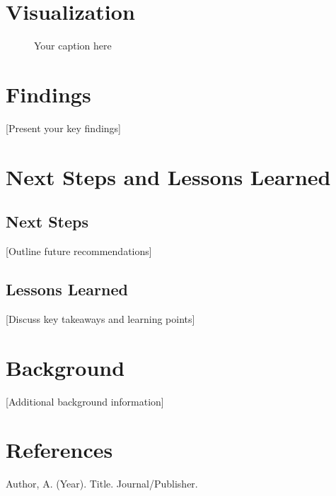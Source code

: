 \documentclass[12pt,a4paper]{article}
\begin{document}
\section{Visualization}
\begin{figure}[H]
    \centering
    \caption{Your caption here}
    \label{fig:your-label}
\end{figure}

\section{Findings}
[Present your key findings]

\section{Next Steps and Lessons Learned}
\subsection{Next Steps}
[Outline future recommendations]

\subsection{Lessons Learned}
[Discuss key takeaways and learning points]

\begin{appendices}
\section{Background}
[Additional background information]

\section{References}
\begin{thebibliography}{9}
     Author, A. (Year). Title. Journal/Publisher.
\end{thebibliography}
\end{appendices}
\end{document}
